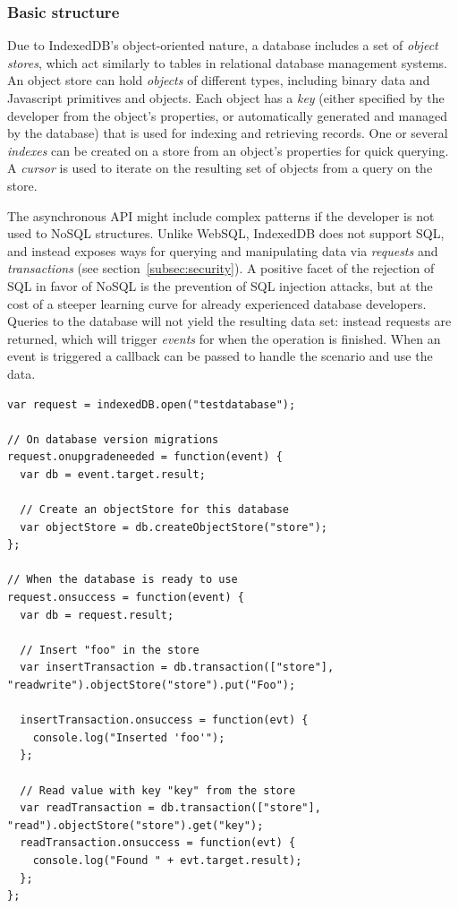 \subsubsection{Basic structure}
Due to IndexedDB's object-oriented nature, a database includes a set of \emph{object stores}, which act similarly to tables in relational database management systems. An object store can hold \emph{objects} of different types, including binary data and Javascript primitives and objects. Each object has a \emph{key} (either specified by the developer from the object's properties, or automatically generated and managed by the database) that is used for indexing and retrieving records. One or several \emph{indexes} can be created on a store from an object's properties for quick querying. A \emph{cursor} is used to iterate on the resulting set of objects from a query on the store.

The asynchronous API might include complex patterns if the developer is not used to NoSQL structures. Unlike WebSQL, IndexedDB does not support SQL, and instead exposes ways for querying and manipulating data via \emph{requests} and \emph{transactions} (see section~\ref{subsec:security}). A positive facet of the rejection of SQL in favor of NoSQL is the prevention of SQL injection attacks, but at the cost of a steeper learning curve for already experienced database developers. Queries to the database will not yield the resulting data set: instead requests are returned, which will trigger \emph{events} for when the operation is finished. When an event is triggered a callback can be passed to handle the scenario and use the data.

\begin{Code}
\begin{lstlisting}[caption={Use of IndexedDB}]
var request = indexedDB.open("testdatabase");

// On database version migrations
request.onupgradeneeded = function(event) {
  var db = event.target.result;

  // Create an objectStore for this database
  var objectStore = db.createObjectStore("store");
};

// When the database is ready to use
request.onsuccess = function(event) {
  var db = request.result;

  // Insert "foo" in the store
  var insertTransaction = db.transaction(["store"], "readwrite").objectStore("store").put("Foo");

  insertTransaction.onsuccess = function(evt) {
    console.log("Inserted 'foo'");
  };

  // Read value with key "key" from the store
  var readTransaction = db.transaction(["store"], "read").objectStore("store").get("key");
  readTransaction.onsuccess = function(evt) {
    console.log("Found " + evt.target.result);
  };
};
\end{lstlisting}
\end{Code}

